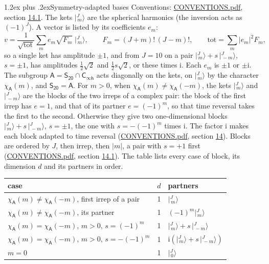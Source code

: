 \documentclass[10pt,a4paper]{article}
\makeatletter
\renewcommand\section{\@startsection{section}{1}{\z@}{-3ex plus -1ex minus -.2ex}%
  {1.2ex plus .2ex}{\normalfont\large\sffamily\bfseries\color{parttitle}}}
\numberwithin{equation}{section}
\newcommand{\grp}[1]{\mathsf{#1}}
\newcommand{\iunit}{\mathrm{i}}
\newcommand{\chiA}{\chi_{\grp{A}}}
\newcommand{\jm}[2]{\bigl\lvert{}^{#1}_{\,#2}\bigr\rangle}
\makeatother
\begin{document}
\section{Symmetry-adapted bases}\label{s:bases}
Conventions: \href{../../CONVENTIONS.pdf}{CONVENTIONS.pdf}, section \href{../../CONVENTIONS.pdf\#conv.14.1}{14.1}.
\leavevmode\label{n:index.m}\label{n:vector.ket}The kets $\jm{J}{m}$ are the spherical harmonics (the inversion acts as $(-1)^J$). \label{n:index.ketcoefficient}\label{n:vector.basis.symmetry}\label{n:index.ketweight}\label{n:index.total}A vector is listed by its coefficients $e_m$:
\begin{equation}\label{e:ket}v = \frac{1}{\sqrt{\mathrm{tot}}}\sum_m e_m\sqrt{F_m}\;\jm{J}{m},\qquad F_m = (J+m)!\,(J-m)!,\qquad \mathrm{tot} = \sum_m |e_m|^2F_m,\end{equation}
\leavevmode\label{n:index.pair.sign}so a single ket has amplitude $\pm1$, and from $J = 10$ on a pair $\jm{J}{m} + s\,\jm{J}{-m}$, $s = \pm1$, has amplitudes $\tfrac{1}{2}\sqrt{2}$ and $\tfrac{1}{2}s\sqrt{2}$, or these times $\iunit$. Each $e_m$ is $\pm1$ or $\pm\iunit$.
\leavevmode\label{n:group.A}\label{n:function.character.abelian}The subgroup $\grp{A} = \grp{S_{20}}\cap\grp{C_{\infty h}}$ acts diagonally on the kets, on $\jm{J}{m}$ by the character $\chiA(m)$, and $\grp{S_{20}} = \grp{A}$. For $m > 0$, when $\chiA(m) \ne \chiA(-m)$, the kets $\jm{J}{m}$ and $\jm{J}{-m}$ are the blocks of the two irreps of a complex pair: the block of the first irrep has $e = 1$, and that of its partner $e = (-1)^m$, so that time reversal takes the first to the second. Otherwise they give two one-dimensional blocks $\jm{J}{m} + s\,\jm{J}{-m}$, $s = \pm1$, the one with $s = -(-1)^m$ times $\iunit$. The factor $\iunit$ makes each block adapted to time reversal (\href{../../CONVENTIONS.pdf}{CONVENTIONS.pdf}, section \href{../../CONVENTIONS.pdf\#conv.14}{14}). Blocks are ordered by $J$, then irrep, then $|m|$, a pair with $s = +1$ first (\href{../../CONVENTIONS.pdf}{CONVENTIONS.pdf}, section \href{../../CONVENTIONS.pdf\#conv.14.1}{14.1}).
\leavevmode\label{n:head.case}\label{n:head.partners}The table lists every case of block, its dimension $d$ and its partners in order.
\begin{center}\begin{tabular}{@{}lrl@{}}\toprule
case & $d$ & partners\\\midrule
$\chiA(m) \ne \chiA(-m)$, first irrep of a pair & 1 & $\jm{J}{m}$\\
$\chiA(m) \ne \chiA(-m)$, its partner & 1 & $(-1)^m\jm{J}{m}$\\
$\chiA(m) = \chiA(-m)$, $m > 0$, $s = (-1)^m$ & 1 & $\jm{J}{m} + s\,\jm{J}{-m}$\\
$\chiA(m) = \chiA(-m)$, $m > 0$, $s = -(-1)^m$ & 1 & $\iunit(\jm{J}{m} + s\,\jm{J}{-m})$\\
$m = 0$ & 1 & $\jm{J}{0}$\\
\bottomrule\end{tabular}\end{center}
\end{document}
